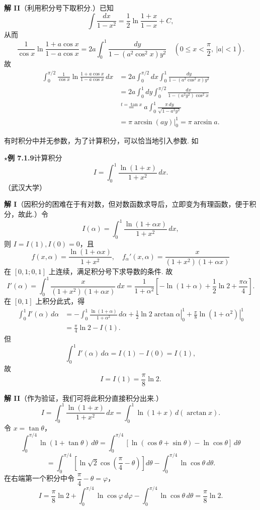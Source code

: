 \documentclass[UTF8, 12pt, fontset=fandol, oneside]{ctexart}
\begin{document}
\noindent\textbf{解 II}\quad （利用积分号下取积分.）已知
\[
\int\frac{dx}{1-x^2}=\frac12\ln\frac{1+x}{1-x}+C,
\]
从而
\[
\frac1{\cos x}\ln\frac{1+a\cos x}{1-a\cos x}
=2a\int_0^1\frac{dy}{1-(a^2\cos^2x)y^2}
\quad\left(0\le x<\frac\pi2,\ |a|<1\right).
\]
故
\[
\begin{aligned}
\int_0^{\pi/2}\frac1{\cos x}\ln\frac{1+a\cos x}{1-a\cos x}\,dx
&=2a\int_0^{\pi/2}dx\int_0^1\frac{dy}{1-(a^2\cos^2x)y^2}\\
&=2a\int_0^1dy\int_0^{\pi/2}\frac{dx}{1-(a^2y^2)\cos^2x}\\
&\stackrel{t=\tan x}{=}a\int_0^1\frac{\pi\,dy}{\sqrt{1-a^2y^2}}\\
&=\left.\pi\arcsin(ay)\right|_0^1=\pi\arcsin a.
\end{aligned}
\]

有时积分中并无参数，为了计算积分，可以恰当地引入参数. 如

\noindent\textbf{$\star$例 7.1.9}\quad 计算积分
\[
I=\int_0^1\frac{\ln(1+x)}{1+x^2}\,dx.
\]
（武汉大学）

\noindent\textbf{解 I}\quad （因积分的困难在于有对数，但对数函数求导后，立即变为有理函数，便于积分，故此.）令
\[
I(\alpha)=\int_0^1\frac{\ln(1+\alpha x)}{1+x^2}\,dx,
\]
则 $I=I(1), I(0)=0$，且
\[
f(x,\alpha)=\frac{\ln(1+\alpha x)}{1+x^2},\quad
f_\alpha'(x,\alpha)=\frac{x}{(1+x^2)(1+\alpha x)}
\]
在 $[0,1;0,1]$ 上连续，满足积分号下求导数的条件. 故
\[
I'(\alpha)=\int_0^1\frac{x}{(1+x^2)(1+\alpha x)}\,dx
=\frac1{1+\alpha^2}\left[-\ln(1+\alpha)+\frac12\ln2+\frac{\pi\alpha}{4}\right].
\]
在 $[0,1]$ 上积分此式，得
\[
\begin{aligned}
\int_0^1I'(\alpha)\,d\alpha
&=-\int_0^1\frac{\ln(1+\alpha)}{1+\alpha^2}\,d\alpha
+\left.\frac12\ln2\arctan\alpha\right|_0^1
+\left.\frac\pi8\ln(1+\alpha^2)\right|_0^1\\
&=\frac\pi4\ln2-I(1).
\end{aligned}
\]
但
\[
\int_0^1I'(\alpha)\,d\alpha=I(1)-I(0)=I(1),
\]
故
\[
I=I(1)=\frac\pi8\ln2.
\]

\noindent\textbf{解 II}\quad （作为验证，我们可将此积分直接积分出来.）
\[
I=\int_0^1\frac{\ln(1+x)}{1+x^2}\,dx
=\int_0^1\ln(1+x)\,d(\arctan x).
\]
令 $x=\tan\theta$，
\[
\int_0^{\pi/4}\ln(1+\tan\theta)\,d\theta
=\int_0^{\pi/4}[\ln(\cos\theta+\sin\theta)-\ln\cos\theta]\,d\theta
\]
\[
=\int_0^{\pi/4}\left[\ln\sqrt2\cos\left(\frac\pi4-\theta\right)\right]d\theta
-\int_0^{\pi/4}\ln\cos\theta\,d\theta.
\]
在右端第一个积分中令 $\dfrac\pi4-\theta=\varphi$，
\[
I=\frac\pi8\ln2+\int_0^{\pi/4}\ln\cos\varphi\,d\varphi
-\int_0^{\pi/4}\ln\cos\theta\,d\theta
=\frac\pi8\ln2.
\]
\end{document}
